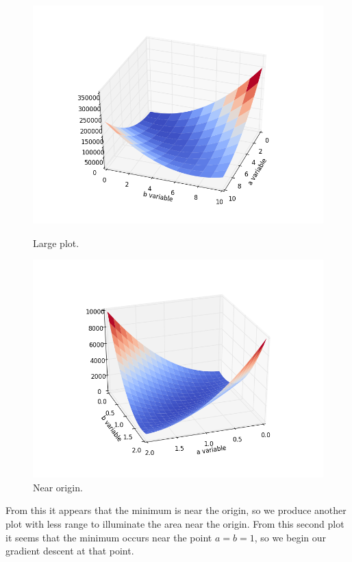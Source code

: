 \documentclass{article}
\begin{document}
\begin{figure}[H]
  \centering
  \begin{minipage}[t]{0.49\textwidth}
    \includegraphics[width=\textwidth]{exercise6/ab_error_big.png}
    \caption*{Large plot.}
  \end{minipage}
  \begin{minipage}[t]{0.49\textwidth}
    \includegraphics[width=\textwidth]{exercise6/ab_error_small.png}
    \caption*{Near origin.}
  \end{minipage}
\end{figure}
From this it appears that the minimum is near the origin, so we produce another plot with less range to illuminate the area near the origin.
From this second plot it seems that the minimum occurs near the point $a=b=1$, so we begin our gradient descent at that point.
\end{document}
